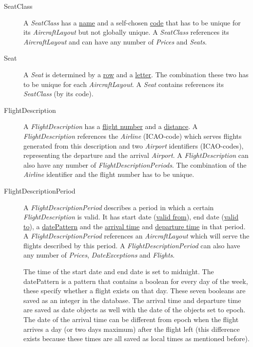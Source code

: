 \documentclass[a4paper,11pt]{article}
\newcommand{\npar}{\par \vspace{2.3ex plus 0.3ex minus 0.3ex} \noindent}
\newcommand{\dsltype}[1]{\textit{#1}}
\newcommand{\dslattr}[1]{\uline{#1}}
\begin{document}
\begin{description}
\item[SeatClass]
A \dsltype{SeatClass} has a \dslattr{name} and a self-chosen \dslattr{code} that has to be unique for its \dsltype{AircraftLayout} but not globally unique. A \dsltype{SeatClass} references its \dsltype{AircraftLayout} and can have any number of \dsltype{Prices} and \dsltype{Seats}.

\item[Seat]
A \dsltype{Seat} is determined by a \dslattr{row} and a \dslattr{letter}. The combination these two has to be unique for each \dsltype{AircraftLayout}. A \dsltype{Seat} contains references its \dsltype{SeatClass} (by its code).

\item[FlightDescription]
A \dsltype{FlightDescription} has a \dslattr{flight number} and a \dslattr{distance}. A \dsltype{FlightDescription} references the \dsltype{Airline} (ICAO-code) which serves flights generated from this description and two \dsltype{Airport} identifiers (ICAO-codes), representing the departure and the arrival \dsltype{Airport}. A \dsltype{FlightDescription} can also have any number of \dsltype{FlightDescriptionPeriods}. The combination of the \dsltype{Airline} identifier and the flight number has to be unique.

\item[FlightDescriptionPeriod]
A \dsltype{FlightDescriptionPeriod} describes a period in which a certain \dsltype{FlightDescription} is valid. It has start date (\dslattr{valid from}), end date (\dslattr{valid to}), a \dslattr{datePattern} and the \dslattr{arrival time} and \dslattr{departure time} in that period. A \dsltype{FlightDescriptionPeriod} references an \dsltype{AircraftLayout} which will serve the flights described by this period. A \dsltype{FlightDescriptionPeriod} can also have any number of \dsltype{Prices}, \dsltype{DateExceptions} and \dsltype{Flights}.

\npar The time of the start date and end date is set to midnight. The datePattern is a pattern that contains a boolean for every day of the week, these specify whether a flight exists on that day. These seven booleans are saved as an integer in the database. The arrival time and departure time are saved as date objects as well with the date of the objects set to epoch. The date of the arrival time can be different from epoch when the flight arrives a day (or two days maximum) after the flight left (this difference exists because these times are all saved as local times as mentioned before).


\end{description}
\end{document}
